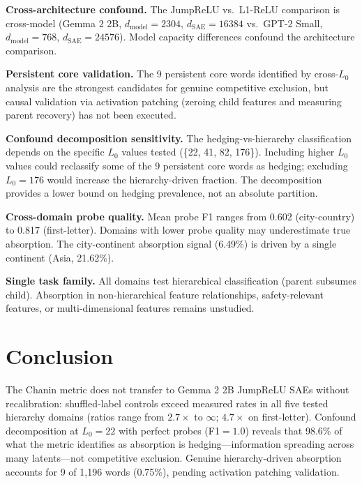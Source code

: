 \documentclass{article}
\begin{document}
\textbf{Cross-architecture confound.} The JumpReLU vs.\ L1-ReLU comparison is cross-model (Gemma 2 2B, $d_{\text{model}} = 2304$, $d_{\text{SAE}} = 16384$ vs.\ GPT-2 Small, $d_{\text{model}} = 768$, $d_{\text{SAE}} = 24576$). Model capacity differences confound the architecture comparison.

\textbf{Persistent core validation.} The 9 persistent core words identified by cross-$L_0$ analysis are the strongest candidates for genuine competitive exclusion, but causal validation via activation patching (zeroing child features and measuring parent recovery) has not been executed.

\textbf{Confound decomposition sensitivity.} The hedging-vs-hierarchy classification depends on the specific $L_0$ values tested (\{22, 41, 82, 176\}). Including higher $L_0$ values could reclassify some of the 9 persistent core words as hedging; excluding $L_0{=}176$ would increase the hierarchy-driven fraction. The decomposition provides a lower bound on hedging prevalence, not an absolute partition.

\textbf{Cross-domain probe quality.} Mean probe F1 ranges from 0.602 (city-country) to 0.817 (first-letter). Domains with lower probe quality may underestimate true absorption. The city-continent absorption signal (6.49\%) is driven by a single continent (Asia, 21.62\%).

\textbf{Single task family.} All domains test hierarchical classification (parent subsumes child). Absorption in non-hierarchical feature relationships, safety-relevant features, or multi-dimensional features \citep{engels2025multidimensional} remains unstudied.


\section{Conclusion}

The Chanin metric does not transfer to Gemma 2 2B JumpReLU SAEs without recalibration: shuffled-label controls exceed measured rates in all five tested hierarchy domains (ratios range from $2.7\times$ to $\infty$; $4.7\times$ on first-letter). Confound decomposition at $L_0{=}22$ with perfect probes (F1${=}1.0$) reveals that 98.6\% of what the metric identifies as absorption is hedging---information spreading across many latents---not competitive exclusion. Genuine hierarchy-driven absorption accounts for 9 of 1,196 words (0.75\%), pending activation patching validation.
\end{document}
